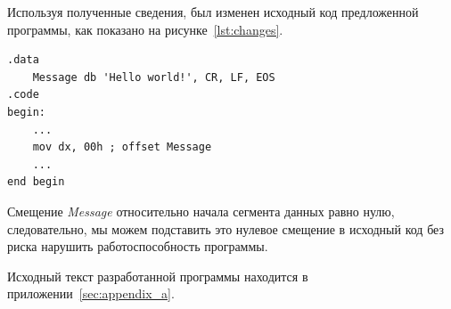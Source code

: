 Используя полученные сведения, был изменен исходный код предложенной программы,
как показано на рисунке~\ref{lst:changes}.

\begin{lstlisting}[caption=Модификация исходного кода,label=lst:changes]
.data
    Message db 'Hello world!', CR, LF, EOS
.code
begin:
    ...
    mov dx, 00h ; offset Message
    ...
end begin
\end{lstlisting}

Смещение \textit{Message} относительно начала сегмента данных равно нулю,
следовательно, мы можем подставить это нулевое смещение в исходный код
без риска нарушить работоспособность программы.

Исходный текст разработанной программы находится в приложении~\ref{sec:appendix_a}.
